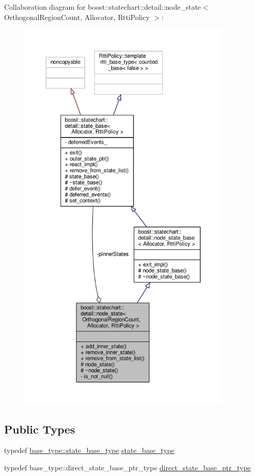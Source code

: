 Collaboration diagram for boost\+:\+:statechart\+:\+:detail\+:\+:node\+\_\+state$<$ Orthogonal\+Region\+Count, Allocator, Rtti\+Policy $>$\+:
\nopagebreak
\begin{figure}[H]
\begin{center}
\leavevmode
\includegraphics[height=550pt]{classboost_1_1statechart_1_1detail_1_1node__state__coll__graph}
\end{center}
\end{figure}
\subsection*{Public Types}
\begin{DoxyCompactItemize}
\item 
typedef \mbox{\hyperlink{classboost_1_1statechart_1_1detail_1_1node__state__base_a2b7ddb7642a5452045d9448444426735}{base\+\_\+type\+::state\+\_\+base\+\_\+type}} \mbox{\hyperlink{classboost_1_1statechart_1_1detail_1_1node__state_a0687cb4eadba3b2feb66322c6b57475b}{state\+\_\+base\+\_\+type}}
\item 
typedef base\+\_\+type\+::direct\+\_\+state\+\_\+base\+\_\+ptr\+\_\+type \mbox{\hyperlink{classboost_1_1statechart_1_1detail_1_1node__state_aa558d33fc74e9580389232c0b7dc7e92}{direct\+\_\+state\+\_\+base\+\_\+ptr\+\_\+type}}
\end{DoxyCompactItemize}
